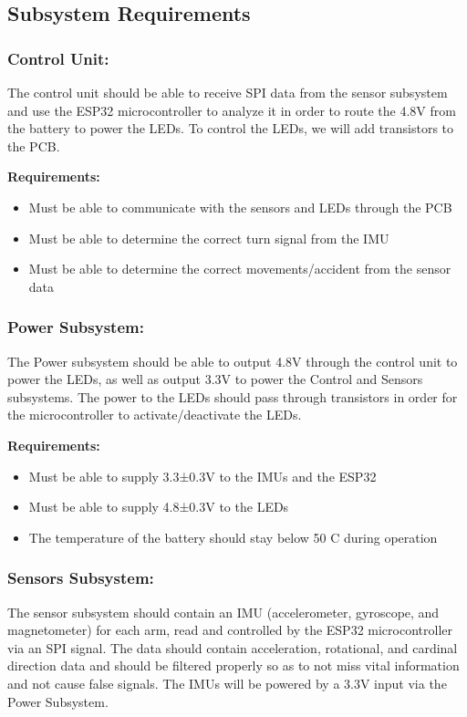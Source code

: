 \documentclass[12pt]{article}
\begin{document}
\subsection{Subsystem Requirements}

\subsubsection{Control Unit:} 
The control unit should be able to receive SPI data from the 
sensor subsystem and use the ESP32 microcontroller to analyze 
it in order to route the 4.8V from the battery to power the LEDs. 
To control the LEDs, we will add transistors \cite{MicrochipVN10K} to the PCB. 

\textbf{Requirements:} 
\begin{itemize}
    \item Must be able to communicate with the sensors and LEDs through the PCB
    \item Must be able to determine the correct turn signal from the IMU
    \item Must be able to determine the correct movements/accident from the sensor data
\end{itemize}

\subsubsection{Power Subsystem:} 
The Power subsystem should be able to output 4.8V through the control unit to power the LEDs, as well as output 3.3V to power the Control and Sensors subsystems.  The power to the LEDs should pass through transistors \cite{MicrochipVN10K} in order for the microcontroller to activate/deactivate the LEDs. 

\textbf{Requirements:} 
\begin{itemize}
    \item Must be able to supply 3.3±0.3V to the IMUs and the ESP32
    \item Must be able to supply 4.8±0.3V to the LEDs
    \item The temperature of the battery should stay below 50 C during operation
    
\end{itemize}

\subsubsection{Sensors Subsystem:}
The sensor subsystem should contain an IMU (accelerometer, gyroscope, and magnetometer) for each arm, read and controlled by the ESP32 microcontroller via an SPI signal. The data should contain acceleration, rotational, and cardinal direction data and should be filtered properly so as to not miss vital information and not cause false signals. The IMUs will be powered by a 3.3V input via the Power Subsystem.
\end{document}
